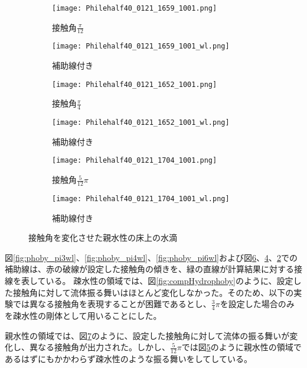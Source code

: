 \documentclass[]{jsarticle}
\begin{document}
\begin{figure}[H]
  \centering
  \begin{subfigure}{0.45\columnwidth}
    \centering
    \texttt{[image: Philehalf40\_0121\_1659\_1001.png]}
    \caption{接触角$\frac{\pi}{12}$}
    \label{fig:phile_pi6}
  \end{subfigure}
  \begin{subfigure}{0.45\columnwidth}
    \centering
    \texttt{[image: Philehalf40\_0121\_1659\_1001\_wl.png]}
    \caption{補助線付き}
    \label{fig:phile_pi6wl}
  \end{subfigure}

  \begin{subfigure}{0.45\columnwidth}
    \centering
    \texttt{[image: Philehalf40\_0121\_1652\_1001.png]}
    \caption{接触角$\frac{\pi}{4}$}
    \label{fig:phile_pi4}
  \end{subfigure}
  \begin{subfigure}{0.45\columnwidth}
    \centering
    \texttt{[image: Philehalf40\_0121\_1652\_1001\_wl.png]}
    \caption{補助線付き}
    \label{fig:phile_pi4wl}
  \end{subfigure}
  \begin{subfigure}{0.45\columnwidth}
    \centering
    \texttt{[image: Philehalf40\_0121\_1704\_1001.png]}
    \caption{接触角$\frac{5}{12}\pi$}
    \label{fig:phile_pi3}
  \end{subfigure}
  \begin{subfigure}{0.45\columnwidth}
    \centering
    \texttt{[image: Philehalf40\_0121\_1704\_1001\_wl.png]}
    \caption{補助線付き}
    \label{fig:phile_pi3wl}
  \end{subfigure}

  \caption{接触角を変化させた親水性の床上の水滴}
  \label{fig:compHydrophile}
\end{figure}

図\ref{fig:phoby_pi3wl}、\ref{fig:phoby_pi4wl}、\ref{fig:phoby_pi6wl}および図\ref{fig:phile_pi3wl}、\ref{fig:phile_pi4wl}、\ref{fig:phile_pi6wl}での補助線は、赤の破線が設定した接触角の傾きを、緑の直線が計算結果に対する接線を表している。
疎水性の領域では、図\ref{fig:compHydrophoby}のように、設定した接触角に対して流体振る舞いはほとんど変化しなかった。そのため、以下の実験では異なる接触角を表現することが困難であるとし、$\frac{3}{4}\pi$を設定した場合のみを疎水性の剛体として用いることにした。

親水性の領域では、図\ref{fig:compHydrophile}のように、設定した接触角に対して流体の振る舞いが変化し、異なる接触角が出力された。しかし、$\frac{5}{12}\pi$では図\ref{fig:phile_pi3}のように親水性の領域であるはずにもかかわらず疎水性のような振る舞いをしてしている。
\end{document}
